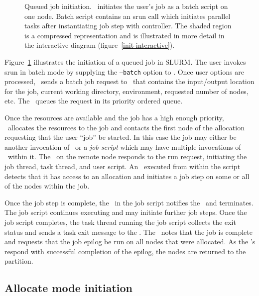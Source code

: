 \begin{figure}[tb]
\centerline{ }
\caption{\small Queued job initiation. 
         \slurmctld\ initiates the user's job as a batch script on one node. 
	 Batch script contains an srun call which initiates parallel tasks 
	 after instantiating job step with controller. The shaded region is 
	 a compressed representation and is illustrated in more detail in the 
	 interactive diagram (figure~\ref{init-interactive}).}
\label{init-batch}
\end{figure}

Figure~\ref{init-batch} illustrates the initiation of a queued job in SLURM.
The user invokes srun in batch mode by supplying the {\tt --batch} option 
to \srun . Once user options are processed, \srun\ sends a batch job request
to \slurmctld\ that contains the input/output location for the job, current
working directory, environment, requested number of nodes, etc. The 
\slurmctld\ queues the request in its priority ordered queue. 

Once the resources are available and the job has a high enough priority,
\slurmctld\ allocates the resources to the job and contacts the first node 
of the allocation requesting that the user ``job'' be started. In this case
the job may either be another invocation of \srun\ or a {\em job script} which
may have multiple invocations of \srun\ within it. The \slurmd\ on the remote
node responds to the run request, initiating the job thread, task thread, 
and user script. An \srun\ executed from within the script detects that it
has access to an allocation and initiates a job step on some or all of the
nodes within the job.

Once the job step is complete, the \srun\ in the job script notifies the
\slurmctld\, and terminates. The job script continues executing and may
initiate further job steps. Once the job script completes, the task
thread running the job script collects the exit status and sends a task exit
message to the \slurmctld . The \slurmctld\ notes that the job is complete
and requests that the job epilog be run on all nodes that were allocated.
As the \slurmd 's respond with successful completion of the epilog, 
the nodes are returned to the partition.

\subsection{Allocate mode initiation}


